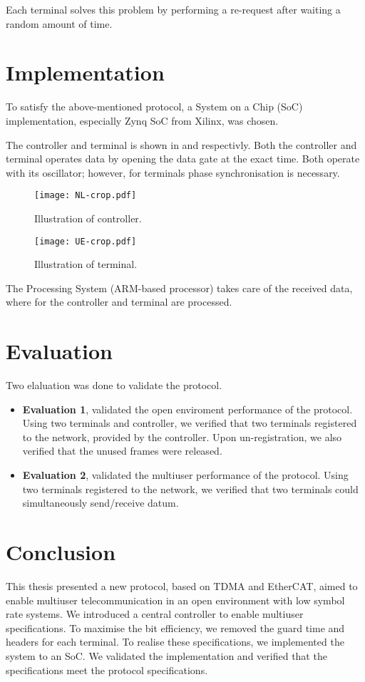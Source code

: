 ﻿\documentclass[twocolumn,9pt]{ltjsarticle}
\renewcommand{\ref}{\Cref}
\begin{document}
Each terminal solves this problem by performing a re-request after waiting a random amount of time.
\section{Implementation}
To satisfy the above-mentioned protocol, a System on a Chip (SoC) implementation, especially Zynq SoC from Xilinx\textregistered, was chosen.

The controller and terminal is shown in \ref{fig:controller} and \ref{fig:terminal} respectivly.
Both the controller and terminal operates data by opening the data gate at the exact time.
Both operate with its oscillator; however, for terminals phase synchronisation is necessary.

\begin{figure}[tb]
  \centering
  \texttt{[image: NL-crop.pdf]}
  \caption{\label{fig:controller}
    Illustration of controller.
  }
\end{figure}

\begin{figure}[tb]
  \centering
  \texttt{[image: UE-crop.pdf]}
  \caption{\label{fig:terminal}
    Illustration of terminal.
  }
\end{figure}

The Processing System (ARM\textregistered -based processor) takes care of the received data, where for the controller and terminal are processed.

\section{Evaluation}
Two elaluation was done to validate the protocol.
\begin{itemize}
\item \textbf{Evaluation 1}, validated the open enviroment performance of the protocol.
  Using two terminals and controller, we verified that two terminals registered to the network, provided by the controller.
  Upon un-registration, we also verified that the unused frames were released.
\item \textbf{Evaluation 2}, validated the multiuser performance of the protocol.
  Using two terminals registered to the network, we verified that two terminals could simultaneously send/receive datum.
\end{itemize}

\section{Conclusion}
This thesis presented a new protocol, based on TDMA and EtherCAT, aimed to enable multiuser telecommunication in an open environment with low symbol rate systems.
We introduced a central controller to enable multiuser specifications.
To maximise the bit efficiency, we removed the guard time and headers for each terminal.
To realise these specifications, we implemented the system to an SoC.
We validated the implementation and verified that the specifications meet the protocol specifications.
\end{document}
